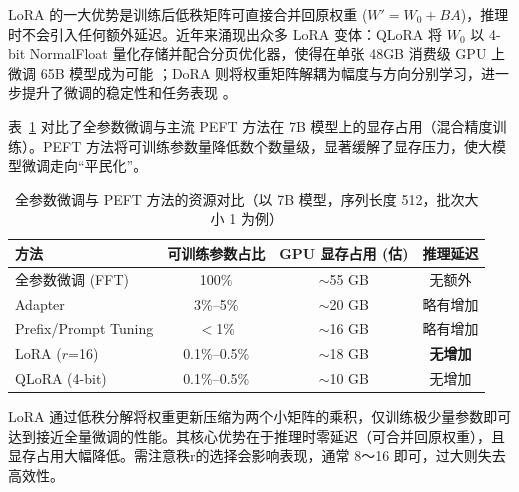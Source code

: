 LoRA 的一大优势是训练后低秩矩阵可直接合并回原权重 ($W' = W_0 + BA$)，推理时不会引入任何额外延迟。近年来涌现出众多 LoRA 变体：QLoRA 将 $W_0$ 以 4-bit NormalFloat 量化存储并配合分页优化器，使得在单张 48GB 消费级 GPU 上微调 65B 模型成为可能 \cite{dettmers-etal:2023qlora}；DoRA 则将权重矩阵解耦为幅度与方向分别学习，进一步提升了微调的稳定性和任务表现 \cite{liu-etal:2024dora}。

表~\ref{tab:peft-memory} 对比了全参数微调与主流 PEFT 方法在 7B 模型上的显存占用（混合精度训练）。PEFT 方法将可训练参数量降低数个数量级，显著缓解了显存压力，使大模型微调走向“平民化”。

\begin{table}[htbp]
\centering
\caption{全参数微调与 PEFT 方法的资源对比（以 7B 模型，序列长度 512，批次大小 1 为例）}
\label{tab:peft-memory}
\begin{tabular}{lccc}
\hline
\textbf{方法} & \textbf{可训练参数占比} & \textbf{GPU 显存占用 (估)} & \textbf{推理延迟} \\
\hline
全参数微调 (FFT) & 100\% & $\sim$55 GB & 无额外 \\
Adapter           & 3\%--5\%  & $\sim$20 GB & 略有增加 \\
Prefix/Prompt Tuning & $<$1\% & $\sim$16 GB & 略有增加 \\
LoRA ($r$=16)     & 0.1\%--0.5\% & $\sim$18 GB & \textbf{无增加} \\
QLoRA (4-bit)     & 0.1\%--0.5\% & $\sim$10 GB & 无增加 \\
\hline
\end{tabular}
\end{table}

\begin{importantnote}
LoRA 通过低秩分解将权重更新压缩为两个小矩阵的乘积，仅训练极少量参数即可达到接近全量微调的性能。其核心优势在于推理时零延迟（可合并回原权重），且显存占用大幅降低。需注意秩r的选择会影响表现，通常 8～16 即可，过大则失去高效性。
\end{importantnote}


